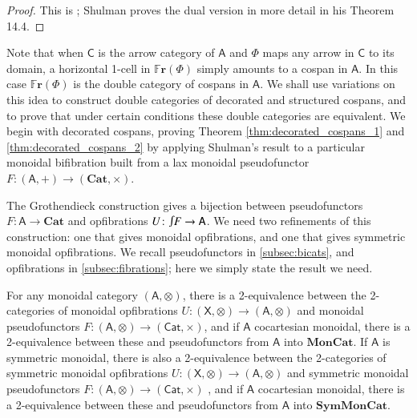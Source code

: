 \documentclass[reqno]{amsart}
\let\maps\colon
\theoremstyle{definition}
\theoremstyle{remark}
\newcommand{\A}{\mathsf{A}}
\newcommand{\C}{\mathsf{C}}
\newcommand{\X}{\mathsf{X}}
\newcommand{\bicat}{\mathbf}
\newcommand{\Cat}{\bicat{Cat}}
\newcommand{\MonCat}{\bicat{MonCat}}
\newcommand{\SMC}{\bicat{SymMonCat}}
\newcommand{\double}[1]{\mathbf{\mathbb #1}}
\newcommand{\Fr}{\double{Fr}}
\newcommand{\inta}{\raisebox{.3\depth}{$\smallint\hspace{-.01in}$}}
\begin{document}
\begin{proof} This is \cite[Theorem 14.9]{Shulman2008}; Shulman proves the dual version in more detail in his Theorem 14.4.  
\end{proof}

Note that when $\C$ is the arrow category of $\A$ and $\Phi$ maps any arrow in $\C$ to its
domain, a horizontal 1-cell in $\Fr(\Phi)$ simply amounts to a cospan in $\A$. In this case $\Fr(\Phi)$ is the double category of cospans in $\A$.    We shall use variations on this idea to construct double categories of decorated and structured cospans, and to prove that under certain conditions these double categories are equivalent.    We begin with decorated cospans, proving Theorem \ref{thm:decorated_cospans_1} and \ref{thm:decorated_cospans_2} by applying Shulman's result to a particular monoidal bifibration built from a lax monoidal pseudofunctor $F \maps (\A,+) \to (\Cat,\times)$.   

The Grothendieck construction gives a bijection between pseudofunctors $F \maps \A \to \Cat$ and opfibrations $U \maps \inta F \to \A$.  We need two refinements of this construction: one that gives monoidal opfibrations, and one that gives symmetric monoidal opfibrations.  We recall pseudofunctors in \cref{subsec:bicats}, and opfibrations in \cref{subsec:fibrations}; here we simply state the result we need.

\begin{lem}
\label{lem:MonGroth}
For any monoidal category $(\A,\otimes)$, there is a 2-equivalence between the 2-categories of monoidal opfibrations $U\maps (\X, \otimes) \to (\A, \otimes)$ and monoidal pseudofunctors $F \maps (\A,\otimes) \to (\mathsf{Cat}, \times)$, and if $\A$ cocartesian monoidal, there is a 2-equivalence between these and pseudofunctors from $\A$ into $\MonCat$.  If $\A$ is symmetric monoidal, there is also a 2-equivalence between the 2-categories of symmetric monoidal opfibrations $U \maps (\X, \otimes) \to (\A, \otimes)$ and symmetric monoidal pseudofunctors $F \maps  (\A,\otimes) \to (\mathsf{Cat}, \times)$ , and if $\A$ cocartesian monoidal, there is a 2-equivalence between these and pseudofunctors from $\A$ into $\SMC$.
\end{lem}
\end{document}
